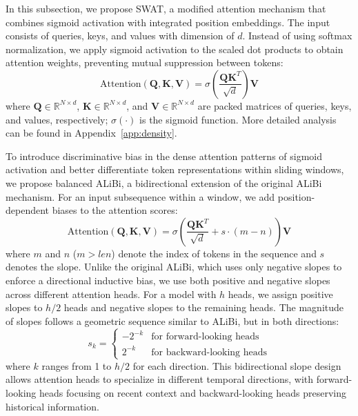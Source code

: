 In this subsection, we propose SWAT, a modified attention mechanism that combines sigmoid activation with integrated position embeddings. The input consists of queries, keys, and values with dimension of $d$. Instead of using softmax normalization, we apply sigmoid activation to the scaled dot products to obtain attention weights, preventing mutual suppression between tokens:
\begin{equation}
\text{Attention}(\boldsymbol{Q}, \boldsymbol{K}, \boldsymbol{V}) = \sigma (\frac{\boldsymbol{Q}\boldsymbol{K}^T}{\sqrt{d}})\boldsymbol{V}
\end{equation}
where $\boldsymbol{Q} \in \mathbb{R}^{N \times d}$, $\boldsymbol{K} \in \mathbb{R}^{N \times d}$, and $\boldsymbol{V} \in \mathbb{R}^{N \times d}$ are packed matrices of queries, keys, and values, respectively; $\sigma ( \cdot )$ is the sigmoid function. More detailed analysis can be found in Appendix~\ref{app:density}.


To introduce discriminative bias in the dense attention patterns of sigmoid activation and better differentiate token representations within sliding windows, we propose balanced ALiBi, a bidirectional extension of the original ALiBi mechanism. For an input subsequence within a window, we add position-dependent biases to the attention scores:
\begin{equation}
\text{Attention}(\boldsymbol{Q}, \boldsymbol{K}, \boldsymbol{V}) = \sigma (\frac{\boldsymbol{Q}\boldsymbol{K}^T}{\sqrt{d}} + s \cdot (m-n))\boldsymbol{V}
\end{equation}
where $m$ and $n$ ($m >le n$) denote the index of tokens in the sequence and $s$ denotes the slope.
Unlike the original ALiBi, which uses only negative slopes to enforce a directional inductive bias, we use both positive and negative slopes across different attention heads. For a model with $h$ heads, we assign positive slopes to $h/2$ heads and negative slopes to the remaining heads. The magnitude of slopes follows a geometric sequence similar to ALiBi, but in both directions:
\begin{equation}
s_k = \begin{cases}
-2^{-k} & \text{for forward-looking heads} \\
2^{-k} & \text{for backward-looking heads}
\end{cases}
\label{eq:-+}
\end{equation}
where $k$ ranges from 1 to $h/2$ for each direction. This bidirectional slope design allows attention heads to specialize in different temporal directions, with forward-looking heads focusing on recent context and backward-looking heads preserving historical information.



